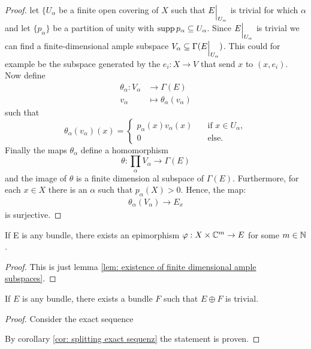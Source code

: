 \begin{proof}
	let $\{U_{\alpha}$ be a finite open covering of $X$ such that ${E}\einsch{U_{\alpha}}$ is trivial for which $\alpha$ and let $\{p_{\alpha}\}$ be a partition of unity with $\operatorname{\mathrm{supp}} p_{\alpha}\subseteq U_{\alpha}$. Since ${E}\einsch{U_ {\alpha}}$ is trivial we can find a finite-dimensional ample subspace $V_{\alpha}\subseteq \Gamma({E}\einsch{U_{\alpha}})$. This could for example be the subspace generated by the $e_i:X\to V$ that send $x$ to $(x,e_i)$. Now define 
	\begin{align*}
		\theta_{\alpha}: V_{\alpha} & \to \Gamma(E)\\
		v_{\alpha}                  &\mapsto \theta_{\alpha}(v_{\alpha})
	\end{align*} such that 
	\begin{equation*}
		\theta_{\alpha}(v_{\alpha})(x)=\begin{cases}
			p_{\alpha}(x)v_{\alpha}(x) & \quad \text{if }x\in U_{\alpha},\\
			0                          & \quad \text{else}.
		\end{cases}    
	\end{equation*}
	Finally the maps $\theta_{\alpha}$ define a homomorphism
	\begin{equation*}
		\theta:\prod_{\alpha}V_{\alpha}\to \Gamma(E)
	\end{equation*}  and the image of $\theta$ is a finite dimension al subspace of $\Gamma(E)$. Furthermore, for each $x\in X$ there is an $\alpha$ such that $p_{\alpha}(X)>0$. Hence, the map:
	\begin{align*}
		\theta_{\alpha}(V_{\alpha})\to E_x
	\end{align*} is surjective.
\end{proof}
\begin{corollary}
	If E is any bundle, there exists an epimorphism $\varphi: X \times \mathbb{C}^m\to E$ for some $m\in \mathbb{N}$.
\end{corollary}
\begin{proof}
	This is just lemma \ref{lem: existence of finite dimensional ample subspaces}.
\end{proof}
\begin{corollary}
	If $E$ is any bundle, there exists a bundle $F$ such that $E\oplus F$ is trivial.
\end{corollary}
\begin{proof}
	Consider the exact sequence 
	 By corollary \ref{cor: splitting exact sequenz} the statement is proven.
\end{proof}
